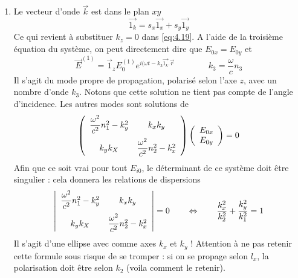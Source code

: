 \begin{enumerate}
\item Le vecteur d'onde $\vec k$ est dans le plan $xy$
\begin{equation}
\vec{1_k} = s_x\vec{1_x}+s_y\vec{1_y}
\end{equation}
Ce qui revient à substituer $k_z=0$ dans \eqref{eq:4.19}. A l'aide de la troisième équation du système,
on peut directement dire que $E_{0x}=E_{0y}$ et 
\begin{equation}
\vec E^{(1)} = \vec{1}_z E_0^{(1)}e^{i(\omega t-k_3\vec{1_k}.\vec{r}}\qquad\qquad
k_3=\dfrac{\omega}{c}n_3
\end{equation}
Il s'agit du mode propre de propagation, polarisé selon l'axe $z$, avec un nombre d'onde $k_3$. Notons que
cette solution ne tient pas compte de l'angle d'incidence. Les autres modes sont solutions de
\begin{equation}
\left(\begin{array}{cc}
\dfrac{\omega^2}{c^2}n^2_1-k_y^2 & k_xk_y\vspace{2mm}\\
k_yk_X&\dfrac{\omega^2}{c^2}n^2_2-k_x^2
\end{array}\right)\left(\begin{array}{c}
E_{0x}\\
E_{0y}
\end{array}\right) = 0
\end{equation}
Afin que ce soit vrai pour tout $E_{i0}$, le déterminant de ce système doit être singulier : cela donnera
les relations de dispersions
\begin{equation}
\left|\begin{array}{cc}
\dfrac{\omega^2}{c^2}n^2_1-k_y^2 & k_xk_y\vspace{2mm}\\
k_yk_X&\dfrac{\omega^2}{c^2}n^2_2-k_x^2
\end{array}\right|=0\qquad\Leftrightarrow\qquad \dfrac{k_x^2}{k^2_2}+\dfrac{k_y^2}{k^2_1}=1
\end{equation}
Il s'agit d'une ellipse avec comme axes $k_x$ et $k_y$ ! Attention à ne pas retenir cette formule sous
risque de se tromper : si on se propage selon $l_x$, la polarisation doit être selon $k_2$ (voila comment
le retenir).\\


\end{enumerate}
